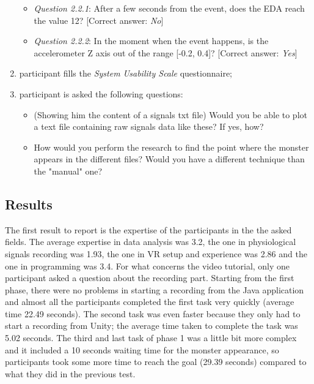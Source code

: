 \documentclass[binding=0.6cm,LaM]{sapthesis}
\begin{document}
\begin{enumerate}
\begin{itemize}

\item \textit{Question 2.2.1}: After a few seconds from the event, does the EDA reach the value 12? [Correct answer: \textit{No}]

\item \textit{Question 2.2.2}: In the moment when the event happens, is the accelerometer Z axis out of the range [-0.2, 0.4]? [Correct answer: \textit{Yes}]

\end{itemize}

\item participant fills the \textit{System Usability Scale} questionnaire;

\item participant is asked the following questions: 

\begin{itemize}

\item (Showing him the content of a signals txt file)
Would you be able to plot a text file containing raw signals data like these? If yes, how? 

\item How would you perform the research to find the point where the monster appears in the different files? Would you have a different technique than the "manual" one?

\end{itemize}

\end{enumerate}

\subsection{Results}
The first result to report is the expertise of the participants in the the asked fields. The average expertise in data analysis was 3.2, the one in physiological signals recording was 1.93, the one in VR setup and experience was 2.86 and the one in programming was 3.4. For what concerns the video tutorial, only one participant asked a question about the recording part. Starting from the first phase, there were no problems in starting a recording from the Java application and almost all the participants completed the first task very quickly (average time 22.49 seconds). The second task was even faster because they only had to start a recording from Unity; the average time taken to complete the task was 5.02 seconds. The third and last task of phase 1 was a little bit more complex and it included a 10 seconds waiting time for the monster appearance, so participants took some more time to reach the goal (29.39 seconds) compared to what they did in the previous test. 
\end{document}
